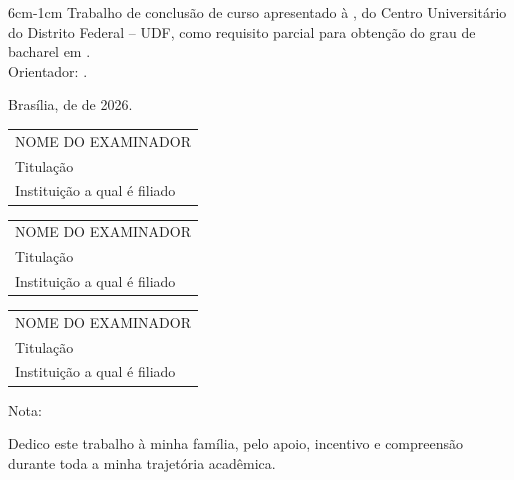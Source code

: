 \documentclass[
	12pt,	
    oneside,
    a4paper,
    brazil  
]{abntex2}
\makeatletter
\newcommand{\imprimirtituloTCC}{\@title}
\newcommand{\imprimirorientadorTCC}{\@orientador}
\newcommand{\imprimircoordenacaoTCC}{\@coordenacao}
\newcommand{\imprimircursoTCC}{\@titulacao}
\makeatother
\begin{document}
\vspace*{10pt}
\begin{center}
\imprimirtituloTCC
\vspace*{60pt}
\begin{adjustwidth}{6cm}{-1cm}
Trabalho de conclusão de curso apresentado à \imprimircoordenacaoTCC, do Centro Universitário do Distrito Federal -- UDF, como requisito parcial para obtenção do grau de bacharel em \imprimircursoTCC. \\[2mm]

Orientador: \imprimirorientadorTCC.
\end{adjustwidth}
\vspace*{40pt}
Brasília, \underline{\hspace{2cm}} de \underline{\hspace{4cm}} de 2026.

\vspace*{30pt}
\begin{tabular}{p{7cm}}
    \hline
    \centering NOME DO EXAMINADOR \\
    \centering Titulação \\
    \centering Instituição a qual é filiado
\end{tabular}

\vspace*{30pt}
\begin{tabular}{p{7cm}}
    \hline
    \centering NOME DO EXAMINADOR \\
    \centering Titulação \\
    \centering Instituição a qual é filiado
\end{tabular}

\vspace*{30pt}
\begin{tabular}{p{7cm}}
    \hline
    \centering NOME DO EXAMINADOR \\
    \centering Titulação \\
    \centering Instituição a qual é filiado
\end{tabular}
\end{center}

\vspace*{40pt}
Nota: \underline{\hspace{2cm}}


\newpage
\begin{dedicatoria2}{}
 Dedico este trabalho à minha família, pelo apoio, incentivo e compreensão durante toda a minha trajetória acadêmica.
 \end{dedicatoria2}
\end{document}
